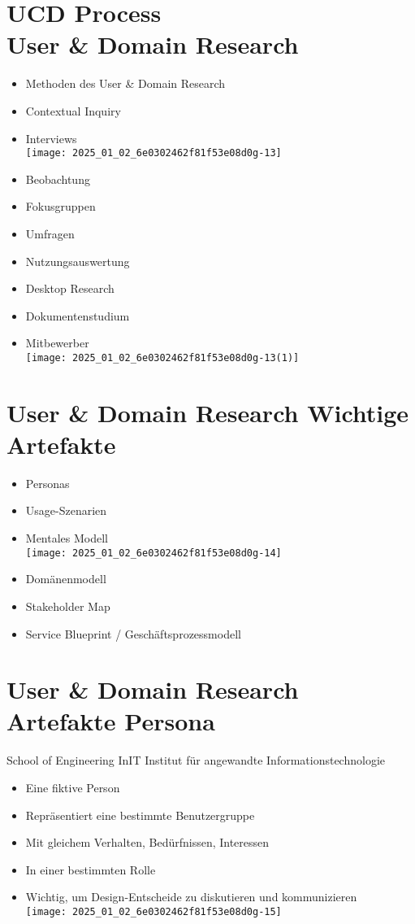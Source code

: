\documentclass[10pt]{article}
\begin{document}
\section*{UCD Process \\
 User \& Domain Research}
\begin{itemize}
  \item Methoden des User \& Domain Research
  \item Contextual Inquiry
  \item Interviews\\
\texttt{[image: 2025\_01\_02\_6e0302462f81f53e08d0g-13]}
  \item Beobachtung
  \item Fokusgruppen
  \item Umfragen
  \item Nutzungsauswertung
  \item Desktop Research
  \item Dokumentenstudium
  \item Mitbewerber\\
\texttt{[image: 2025\_01\_02\_6e0302462f81f53e08d0g-13(1)]}
\end{itemize}

\section*{User \& Domain Research Wichtige Artefakte}
\begin{itemize}
  \item Personas
  \item Usage-Szenarien
  \item Mentales Modell\\
\texttt{[image: 2025\_01\_02\_6e0302462f81f53e08d0g-14]}
  \item Domänenmodell
  \item Stakeholder Map
  \item Service Blueprint / Geschäftsprozessmodell
\end{itemize}

\section*{User \& Domain Research Artefakte Persona}
School of Engineering InIT Institut für angewandte Informationstechnologie

\begin{itemize}
  \item Eine fiktive Person
  \item Repräsentiert eine bestimmte Benutzergruppe
  \item Mit gleichem Verhalten, Bedürfnissen, Interessen
  \item In einer bestimmten Rolle
  \item Wichtig, um Design-Entscheide zu diskutieren und kommunizieren\\
\texttt{[image: 2025\_01\_02\_6e0302462f81f53e08d0g-15]}
\end{itemize}
\end{document}
